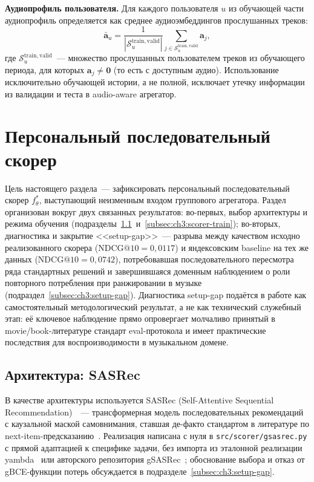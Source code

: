 \textbf{Аудиопрофиль пользователя.} Для каждого пользователя $u$ из обучающей части аудиопрофиль определяется как среднее аудиоэмбеддингов прослушанных треков:
\begin{equation*}
    \bar{\mathbf{a}}_u = \frac{1}{|\mathcal{S}_u^{\mathrm{train, valid}}|} \sum_{j \in \mathcal{S}_u^{\mathrm{train, valid}}} \mathbf{a}_j,
\end{equation*}
где $\mathcal{S}_u^{\mathrm{train, valid}}$~--- множество прослушанных пользователем треков из обучающего периода, для которых $\mathbf{a}_j \neq \mathbf{0}$ (то есть с доступным аудио). Использование исключительно обучающей истории, а не полной, исключает утечку информации из валидации и теста в audio-aware агрегатор.

\section{Персональный последовательный скорер}\label{sec:ch3:scorer}

Цель настоящего раздела~--- зафиксировать персональный последовательный скорер $f_\theta^\ast$, выступающий неизменным входом группового агрегатора. Раздел организован вокруг двух связанных результатов: во-первых, выбор архитектуры и режима обучения (подразделы~\ref{subsec:ch3:sasrec-arch}~и~\ref{subsec:ch3:scorer-train}); во-вторых, диагностика и закрытие <<setup-gap>>~--- разрыва между качеством исходно реализованного скорера ($\mathrm{NDCG@10} = 0{,}0117$) и яндексовским baseline на тех же данных ($\mathrm{NDCG@10} = 0{,}0742$), потребовавшая последовательного пересмотра ряда стандартных решений и завершившаяся доменным наблюдением о роли повторного потребления при ранжировании в музыке (подраздел~\ref{subsec:ch3:setup-gap}). Диагностика setup-gap подаётся в работе как самостоятельный методологический результат, а не как технический служебный этап: её ключевое наблюдение прямо опровергает молчаливо принятый в movie/book-литературе стандарт eval-протокола и имеет практические последствия для воспроизводимости в музыкальном домене.

\subsection{Архитектура: SASRec}\label{subsec:ch3:sasrec-arch}

В качестве архитектуры используется SASRec (Self-Attentive Sequential Recommendation)~\cite{sasrec2018}~--- трансформерная модель последовательных рекомендаций с каузальной маской самовнимания, ставшая де-факто стандартом в литературе по next-item-предсказанию~\cite{petrov2022bert4rec_replicability, gsasrec2023}. Реализация написана с нуля в \texttt{src/scorer/gsasrec.py} с прямой адаптацией к специфике задачи, без импорта из эталонной реализации yambda~\cite{yambda2025} или авторского репозитория gSASRec~\cite{gsasrec2023}; обоснование выбора и отказ от gBCE-функции потерь обсуждается в подразделе~\ref{subsec:ch3:setup-gap}.

